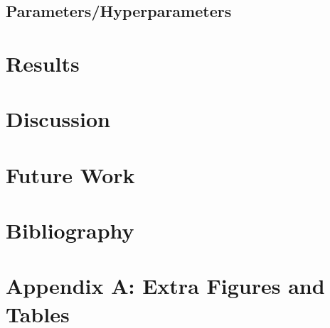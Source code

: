 \documentclass[twocolumn,10pt]{article}
\begin{document}
\subsection{Parameters/Hyperparameters}

\section{Results}

\section{Discussion}

\section{Future Work}

\section*{Bibliography}




\appendix

\section*{Appendix A: Extra Figures and Tables}
\end{document}

